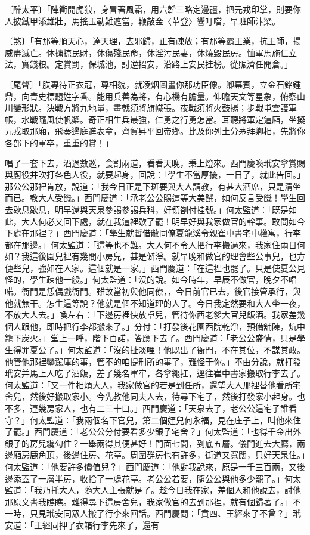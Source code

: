 〔醉太平〕「陣衝開虎狼，身冒著風霜，用六韜三略定邊疆，把元戎印掌，則要你人披鐵甲添雄壯，馬搖玉勒難遮當，鞭敲金〈革登〉響叮噹，早班師汴梁。

〔煞〕「有那等順天心，達天理，去邪歸，正有疎放；有那等霸王業，抗王師，揚威盡滅亡。休擄掠民財，休傷殘民命，休淫污民妻，休燒毀民房。恤軍馬施仁立法，實錢粮。定賞罰，保城池，討逆招安，沿路上安民挂榜。從賑濟任開倉。」

〔尾聲〕「朕專待正衣冠，尊相貌，就凌烟圖畫你那功臣像。卿幕賓，立金石銘鍾鼎，向青史標題姓字香。能用兵善為將，有心機有膽量。仰瞻天文等星象，俯察山川變形狀。決戰方將九地量，畫戟須將旗幟張。夜戰須將火鼓揚；步戰屯雲護軍帳，水戰隨風使帆槳。奇正相生兵最強，仁勇之行勇怎當。耳聽將軍定這廂，坐擬元戎取那廂，飛奏邊庭進表章，齊賀昇平回帝鄉。比及你列土分茅拜卿相，先將你各部下的軍卒，重重的賞！」

唱了一套下去，酒過數巡，食割兩道，看看天晚，秉上燈來。西門慶喚玳安拿賞賜與廚役并吹打各色人役，就要起身，回說：「學生不當厚擾，一日了，就此告回。」那公公那裡肯放，說道：「我今日正是下斑要與大人請教，有甚大酒席，只是清坐而已。教大人受饑。」西門慶道：「承老公公賜這等大美饌，如何反言受饑！學生回去歇息歇息，明早還與天泉參謁參謁兵科，好領劄付挂號。」何太監道：「既是如此，大人何必又回下處，就在我這裡歇了罷！明早好與我家做官的幹事。敢問如今下處在那裡？」西門慶道：「學生就暫借敝同僚夏龍溪令親崔中書宅中權寓，行李都在那邊。」何太監道：「這等也不難。大人何不令人把行李搬過來，我家住兩日何如？我這後園兒裡有幾間小房兒，甚是僻淨。就早晚和做官的理會些公事兒，也方便些兒，強如在人家。這個就是一家。」西門慶道：「在這裡也罷了。只是使夏公見怪的，學生疎他一般。」何太監道：「沒的說。如今時年，早辰不做官，晚夕不唱喏。衙門是恁偶戲衙門。雖故當初與他同僚，，今日前官已去，後官接管承行，與他就無干。怎生這等說？他就是個不知道理的人了。今日我定然要和大人坐一夜，不放大人去。」喚左右：「下邊房裡快放卓兒，管待你西老爹大官兒飯酒。我家差幾個人跟他，即時把行李都搬來了。」分付：「打發後花園西院乾淨，預備舖陳，炕中籠下炭火。」堂上一呼，階下百諾，答應下去了。西門慶道：「老公公盛情，只是學生得罪夏公了。」何太監道：「沒的扯淡哩！他既出了衙門，不在其位，不謀其政。他管他那裡鑾駕庫的事，管不的咱提刑所的事了，難怪于你。」不由分說，就打發玳安并馬上人吃了酒飯，差了幾名軍牢，各拿繩扛，逕往崔中書家搬取行李去了。何太監道：「又一件相煩大人，我家做官的若是到任所，還望大人那裡替他看所宅舍兒，然後好搬取家小。今先教他同夫人去，待尋下宅子，然後打發家小起身。也不多，連幾房家人，也有二三十口。」西門慶道：「天泉去了，老公公這宅子誰看守？」何太監道：「我兩個名下官兒，第二個姪兒何永福，見在庄子上，叫他來住了罷。」西門慶道：「老公公分付要看多少銀子宅舍？」何太監道：「也得千金出外銀子的房兒纔勾住？一舉兩得其便甚好！門面七間，到底五層。儀門進去大廳，兩邊廂房鹿角頂，後邊住房、花亭。周圍群房也有許多，街道又寬闊，只好天泉住。」何太監道：「他要許多價值兒？」西門慶道：「他對我說來，原是一千三百兩，又後邊添蓋了一層半房，收拾了一處花亭。老公公若要，隨公公與他多少罷了。」何太監道：「我乃托大人，隨大人主張就是了。趁今日我在家，差個人和他說去，討他那原文書我瞧瞧。難得尋下這房舍兒，我家做官的去到那裡，就有個歸著了。」不一時，只見玳安同眾人搬了行李來回話。西門慶問：「賁四、王經來了不曾？」玳安道：「王經同押了衣箱行李先來了，還有
